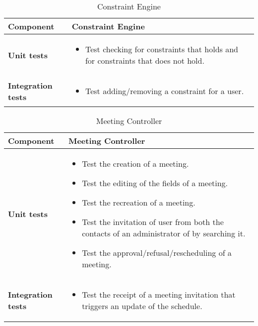 \begin{table}[h]	
	\centering
	\def\arraystretch{1.5}
	\begin{tabular}{|m{4cm}|m{12cm}|}
		\hline
		\textbf{Component} & Constraint Engine \\ \hline
		\textbf{Unit tests} & 
			\begin{itemize}
			\item Test checking for constraints that holds and for constraints that does not hold.
			\end{itemize} \\ \hline
		\textbf{Integration tests} & 
			\begin{itemize}
			\item Test adding/removing a constraint for a user.
			\end{itemize} \\ \hline
	\end{tabular}
	\caption{Constraint Engine}
\end{table}

\begin{table}[h]	
	\centering
	\def\arraystretch{1.5}
	\begin{tabular}{|m{4cm}|m{12cm}|}
		\hline
		\textbf{Component} & Meeting Controller \\ \hline
		\textbf{Unit tests} & 
			\begin{itemize}
			\item Test the creation of a meeting.
			\item Test the editing of the fields of a meeting.
			\item Test the recreation of a meeting.
			\item Test the invitation of user from both the contacts of an administrator of by searching it.
			\item Test the approval/refusal/rescheduling of a meeting.
			\end{itemize} \\ \hline
		\textbf{Integration tests} & 
			\begin{itemize}
			\item Test the receipt of a meeting invitation that triggers an update of the schedule.
			\end{itemize} \\ \hline
	\end{tabular}
	\caption{Meeting Controller}
\end{table}

